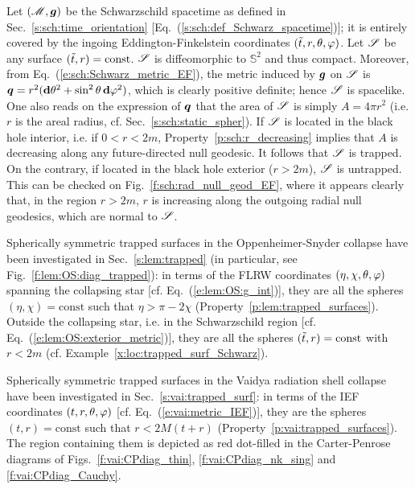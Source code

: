 \begin{example}
\label{x:loc:trapped_surf_Schwarz}
Let $(\mathscr{M},\bm{g})$ be the Schwarzschild spacetime as defined in Sec.~\ref{s:sch:time_orientation} [Eq.~(\ref{s:sch:def_Schwarz_spacetime})]; it is entirely covered by the ingoing Eddington-Finkelstein coordinates
$({\tilde t},r,\theta,\varphi)$. Let $\mathscr{S}$ be any surface $({\tilde t},r) = \mathrm{const}$.
$\mathscr{S}$ is diffeomorphic to $\mathbb{S}^2$ and thus compact.
Moreover, from Eq.~(\ref{e:sch:Schwarz_metric_EF}), the metric induced by $\bm{g}$
on $\mathscr{S}$ is $\bm{q} = r^2 (\mathbf{d}\theta^2 + \sin^2\theta\,\mathbf{d}\varphi^2)$, which is clearly positive definite;
hence $\mathscr{S}$ is spacelike. One also reads on the expression of $\bm{q}$
that the area of  $\mathscr{S}$ is simply $A = 4\pi r^2$ (i.e. $r$ is the areal radius, cf. Sec.~\ref{s:sch:static_spher}).
If $\mathscr{S}$ is located in the black hole interior, i.e. if $0<r < 2m$,
Property~\ref{p:sch:r_decreasing} implies that $A$ is decreasing along any future-directed null
geodesic. It follows that $\mathscr{S}$ is trapped. On the contrary, if located in the black hole exterior
($r> 2m$), $\mathscr{S}$ is untrapped. This can be checked on Fig.~\ref{f:sch:rad_null_geod_EF},
where it appears clearly that, in the region $r>2m$, $r$ is increasing along the outgoing radial null geodesics, which are normal to $\mathscr{S}$.
\end{example}

\begin{example}
\label{x:loc:trapped_surf_OS}
Spherically symmetric trapped surfaces in the Oppenheimer-Snyder collapse
have been investigated in Sec.~\ref{s:lem:trapped} (in particular, see Fig.~\ref{f:lem:OS:diag_trapped}): in terms of the FLRW coordinates $(\eta,\chi,\theta,\varphi)$
spanning the collapsing star
[cf. Eq.~(\ref{e:lem:OS:g_int})], they are all the spheres $(\eta,\chi) = \mathrm{const}$
such that $\eta > \pi - 2 \chi$ (Property~\ref{p:lem:trapped_surfaces}). Outside
the collapsing star, i.e. in the Schwarzschild region [cf. Eq.~(\ref{e:lem:OS:exterior_metric})], they are all the spheres
$({\tilde t},r) = \mathrm{const}$ with $r< 2m$ (cf. Example~\ref{x:loc:trapped_surf_Schwarz}).
\end{example}

\begin{example}
\label{x:loc:trapped_surf_Vaidya}
Spherically symmetric trapped surfaces in the Vaidya radiation shell collapse
have been investigated in Sec.~\ref{s:vai:trapped_surf}: in terms of the
IEF coordinates $(t,r,\theta,\varphi)$ [cf. Eq.~(\ref{e:vai:metric_IEF})],
they are the spheres $(t,r) = \mathrm{const}$
such that $r < 2M(t+r)$ (Property~\ref{p:vai:trapped_surfaces}).
The region containing them is depicted as red dot-filled
in the Carter-Penrose diagrams of Figs.~\ref{f:vai:CPdiag_thin}, \ref{f:vai:CPdiag_nk_sing}
and \ref{f:vai:CPdiag_Cauchy}.
\end{example}


